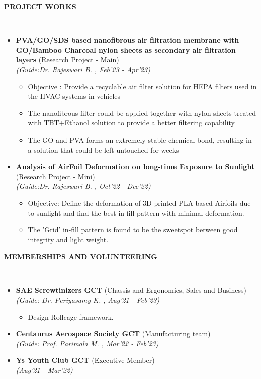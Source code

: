 \documentclass[a4paper,10pt]{article}
\newcommand{\isep}{-2 pt}
\newcommand{\lsep}{-0.5cm}
\newcommand{\resheading}[1]{{\small \colorbox{mygrey}{\begin{minipage}{0.975\textwidth}{\textbf{#1 \vphantom{p\^{E}}}}\end{minipage}}}}
\begin{document}
\resheading{\textbf{PROJECT WORKS} }\\[\lsep]
\begin{itemize}
\item \textbf{PVA/GO/SDS based nanofibrous air filtration membrane with GO/Bamboo Charcoal nylon sheets as secondary air filtration layers
} (Research Project - Main) \\
 \emph{(Guide:Dr. Rajeswari B.
	, Feb'23 - Apr'23)} \\[-0.6cm]
	\begin{itemize}\itemsep \isep
	\item Objective : Provide a recyclable air filter solution for HEPA filters used in the HVAC systems in vehicles
	\item The nanofibrous filter could be applied together with nylon sheets treated with TBT+Ethanol solution to provide a better filtering capability

	\item The GO and PVA forms an extremely stable chemical bond, resulting in a solution that could be left untouched for weeks

	\end{itemize}

\item \textbf{Analysis of AirFoil Deformation on long-time Exposure to Sunlight
} (Research Project - Mini) \\
 \emph{(Guide:Dr. Rajeswari B.
, Oct'22 - Dec'22)} \\[-0.6cm]
	\begin{itemize}\itemsep \isep
	\item Objective: Define the deformation of 3D-printed PLA-based Airfoils due to sunlight and find the best in-fill pattern with minimal deformation.
	\item The 'Grid' in-fill pattern is found to be the sweetspot between good integrity and light weight.
	\end{itemize}
\end{itemize}

\resheading{\textbf{MEMBERSHIPS AND VOLUNTEERING} }\\[\lsep]
\begin{itemize}
\item \textbf{SAE Screwtinizers GCT
} (Chassis and Ergonomics, Sales and Business) \\
\emph{(Guide: Dr. Periyasamy K.
, Aug'21 - Feb'23)} \\[-0.6cm]
	\begin{itemize}\itemsep \isep
	\item Design Rollcage framework.
	\end{itemize}
\item \textbf{Centaurus Aerospace Society GCT
} (Manufacturing team) \\
\emph{(Guide: Prof. Parimala M. 
, Mar'22 - Feb'23)} 

\item \textbf{Ys Youth Club GCT
} (Executive Member) \\
\emph{(Aug'21 - Mar'22)} 
\end{itemize}
		
\end{document}
